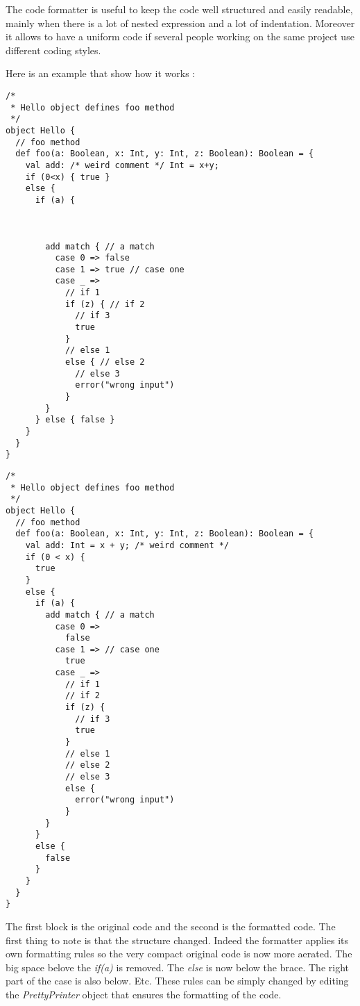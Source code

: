 The code formatter is useful to keep the code well structured and easily readable, mainly when there is a lot of nested expression and a lot of indentation. Moreover it allows to have a uniform code if several people working on the same project use different coding styles. 

Here is an example that show how it works :

\begin{lstlisting}
/*
 * Hello object defines foo method
 */
object Hello {
  // foo method
  def foo(a: Boolean, x: Int, y: Int, z: Boolean): Boolean = {
    val add: /* weird comment */ Int = x+y;
    if (0<x) { true }
    else {
      if (a) {



        add match { // a match
          case 0 => false
          case 1 => true // case one
          case _ =>
            // if 1
            if (z) { // if 2
              // if 3
              true
            } 
            // else 1
            else { // else 2
              // else 3
              error("wrong input")
            }
        }
      } else { false }
    }
  }
}
\end{lstlisting} 

\begin{lstlisting}
/*
 * Hello object defines foo method
 */
object Hello { 
  // foo method
  def foo(a: Boolean, x: Int, y: Int, z: Boolean): Boolean = { 
    val add: Int = x + y; /* weird comment */
    if (0 < x) {
      true
    }
    else {
      if (a) {
        add match { // a match
          case 0 => 
            false
          case 1 => // case one
            true
          case _ => 
            // if 1
            // if 2
            if (z) {
              // if 3
              true
            }
            // else 1
            // else 2
            // else 3
            else {
              error("wrong input") 
            }
        }
      }
      else {
        false
      }
    }
  }
}
\end{lstlisting}

The first block is the original code and the second is the formatted code. The first thing to note is that the structure changed. Indeed the formatter applies its own formatting rules so the very compact original code is now more aerated. The big space belove the \emph{if(a)} is removed. The \emph{else} is now below the brace. The right part of the case is also below. Etc. These rules can be simply changed by editing the \emph{PrettyPrinter} object that ensures the formatting of the code. 

